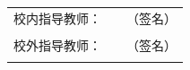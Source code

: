 {\begin{titlepage}
\begin{textblock*}{\textwidth}
{\begin{center}
                        \begin{tabular}[b]{B{4.1cm} B{6.03cm} B{2cm}}
                            {校内指导教师：} &
                                      & {（签名）} \\\\[0.45cm]  %
                            {校外指导教师：} &
                                      & {（签名）} \\ \\[0.45cm]  %
                        \end{tabular}
                    \end{center}

                    \begin{center}
                        \song \sanhao
                        \hspace{8em}\@date
                    \end{center}
                }
        \end{textblock*}
        \ %
    \end{titlepage}
    \newpage
}
\makeatother